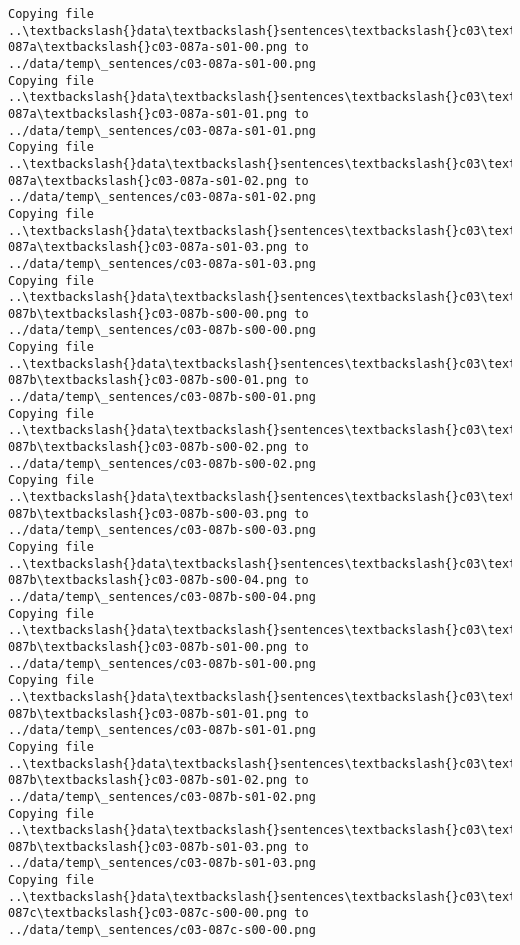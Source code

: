 \documentclass[11pt]{article}
\begin{document}
\begin{Verbatim}[commandchars=\\\{\}]
Copying file ..\textbackslash{}data\textbackslash{}sentences\textbackslash{}c03\textbackslash{}c03-087a\textbackslash{}c03-087a-s01-00.png to
../data/temp\_sentences/c03-087a-s01-00.png
Copying file ..\textbackslash{}data\textbackslash{}sentences\textbackslash{}c03\textbackslash{}c03-087a\textbackslash{}c03-087a-s01-01.png to
../data/temp\_sentences/c03-087a-s01-01.png
Copying file ..\textbackslash{}data\textbackslash{}sentences\textbackslash{}c03\textbackslash{}c03-087a\textbackslash{}c03-087a-s01-02.png to
../data/temp\_sentences/c03-087a-s01-02.png
Copying file ..\textbackslash{}data\textbackslash{}sentences\textbackslash{}c03\textbackslash{}c03-087a\textbackslash{}c03-087a-s01-03.png to
../data/temp\_sentences/c03-087a-s01-03.png
Copying file ..\textbackslash{}data\textbackslash{}sentences\textbackslash{}c03\textbackslash{}c03-087b\textbackslash{}c03-087b-s00-00.png to
../data/temp\_sentences/c03-087b-s00-00.png
Copying file ..\textbackslash{}data\textbackslash{}sentences\textbackslash{}c03\textbackslash{}c03-087b\textbackslash{}c03-087b-s00-01.png to
../data/temp\_sentences/c03-087b-s00-01.png
Copying file ..\textbackslash{}data\textbackslash{}sentences\textbackslash{}c03\textbackslash{}c03-087b\textbackslash{}c03-087b-s00-02.png to
../data/temp\_sentences/c03-087b-s00-02.png
Copying file ..\textbackslash{}data\textbackslash{}sentences\textbackslash{}c03\textbackslash{}c03-087b\textbackslash{}c03-087b-s00-03.png to
../data/temp\_sentences/c03-087b-s00-03.png
Copying file ..\textbackslash{}data\textbackslash{}sentences\textbackslash{}c03\textbackslash{}c03-087b\textbackslash{}c03-087b-s00-04.png to
../data/temp\_sentences/c03-087b-s00-04.png
Copying file ..\textbackslash{}data\textbackslash{}sentences\textbackslash{}c03\textbackslash{}c03-087b\textbackslash{}c03-087b-s01-00.png to
../data/temp\_sentences/c03-087b-s01-00.png
Copying file ..\textbackslash{}data\textbackslash{}sentences\textbackslash{}c03\textbackslash{}c03-087b\textbackslash{}c03-087b-s01-01.png to
../data/temp\_sentences/c03-087b-s01-01.png
Copying file ..\textbackslash{}data\textbackslash{}sentences\textbackslash{}c03\textbackslash{}c03-087b\textbackslash{}c03-087b-s01-02.png to
../data/temp\_sentences/c03-087b-s01-02.png
Copying file ..\textbackslash{}data\textbackslash{}sentences\textbackslash{}c03\textbackslash{}c03-087b\textbackslash{}c03-087b-s01-03.png to
../data/temp\_sentences/c03-087b-s01-03.png
Copying file ..\textbackslash{}data\textbackslash{}sentences\textbackslash{}c03\textbackslash{}c03-087c\textbackslash{}c03-087c-s00-00.png to
../data/temp\_sentences/c03-087c-s00-00.png

\end{Verbatim}
\end{document}
